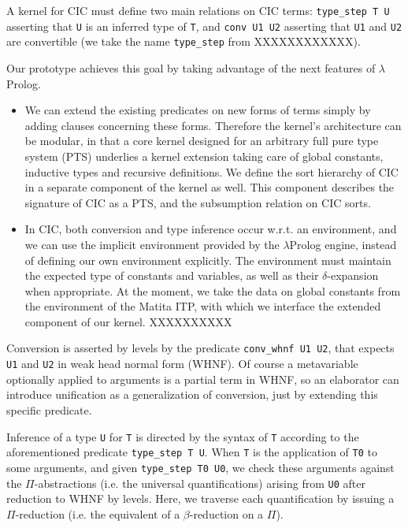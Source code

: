 A kernel for CIC must define two main relations on CIC terms:
\verb+type_step T U+
asserting that \verb+U+ is an inferred type of \verb+T+,
and \verb+conv U1 U2+ 
asserting that \verb+U1+ and \verb+U2+ are convertible
(we take the name \verb+type_step+ from XXXXXXXXXXXX).

Our prototype achieves this goal by taking advantage of the next features of $\lambda$Prolog.

\begin{itemize}

\item
We can extend the existing predicates on new forms of terms
simply by adding clauses concerning these forms. 
Therefore the kernel's architecture can be modular,
in that a core kernel designed for an arbitrary full pure type system (PTS)
underlies a kernel extension taking care of global constants,
inductive types and recursive definitions.
We define the sort hierarchy of CIC in a separate component of the kernel as well.
This component describes the signature of CIC as a PTS,
and the subsumption relation on CIC sorts.

\item
In CIC, both conversion and type inference occur w.r.t. an environment,
and we can use the implicit environment provided by the
$\lambda$Prolog engine, instead of defining our own environment explicitly.
The environment must maintain the expected type of constants and variables,
as well as their $\delta$-expansion when appropriate.
At the moment, we take the data on global constants from the
environment of the Matita ITP, with which we interface the extended
component of our kernel. XXXXXXXXXX

\end{itemize}

Conversion is asserted by levels by the predicate \verb+conv_whnf U1 U2+,
that expects \verb+U1+ and \verb+U2+ in weak head normal form (WHNF).
Of course a metavariable optionally applied to arguments is a partial
term in WHNF, so an elaborator can introduce unification as a
generalization of conversion, just by extending this specific predicate.

Inference of a type \verb+U+ for \verb+T+ is directed by the syntax of \verb+T+
according to the aforementioned predicate \verb+type_step T U+.
When \verb+T+ is the application of \verb+T0+ to some arguments,
and given \verb+type_step T0 U0+,
we check these arguments against the $\Pi$-abstractions (i.e. the
universal quantifications) arising from \verb+U0+ after reduction to
WHNF by levels. Here, we traverse each quantification by issuing a $\Pi$-reduction
(i.e. the equivalent of a $\beta$-reduction on a $\Pi$).

